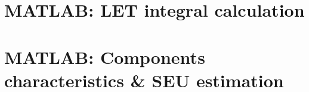 \documentclass{article}
\begin{document}
\newpage				%
\begin{appendices}
     \section{\label{app:matlab:LET}MATLAB: LET integral calculation}
    
    
	\newpage    
    \section{\label{app:matlab:sigma}MATLAB: Components characteristics \& SEU estimation}
    

\end{appendices}
\end{document}
